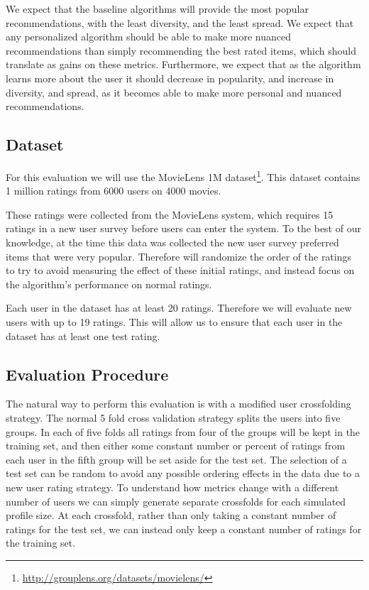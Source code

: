 \documentclass[letterpaper]{sig-alternate}
\begin{document}
  We expect that the baseline algorithms will provide the most popular recommendations, with the least diversity, and the least spread.
  We expect that any personalized algorithm should be able to make more nuanced recommendations than simply recommending the best rated items, which should translate as gains on these metrics.
  Furthermore, we expect that as the algorithm learns more about the user it should decrease in popularity, and increase in diversity, and spread, as it becomes able to make more personal and nuanced recommendations.


  \subsection*{Dataset}

  For this evaluation we will use the MovieLens 1M dataset\footnote{\url{http://grouplens.org/datasets/movielens/}}.
  This dataset contains 1 million ratings from 6000 users on 4000 movies.
  
  These ratings were collected from the MovieLens system, which requires 15 ratings in a new user survey before users can enter the system.
  To the best of our knowledge, at the time this data was collected the new user survey preferred items that were very popular.
  Therefore will randomize the order of the ratings to try to avoid measuring the effect of these initial ratings, and instead focus on the algorithm's performance on normal ratings.
  
  Each user in the dataset has at least 20 ratings.
  Therefore we will evaluate new users with up to 19 ratings.
  This will allow us to ensure that each user in the dataset has at least one test rating.

  
  \subsection*{Evaluation Procedure}

  The natural way to perform this evaluation is with a modified user crossfolding strategy.
  The normal 5 fold cross validation strategy splits the users into five groups.
  In each of five folds all ratings from four of the groups will be kept in the training set, and then either some constant number or percent of ratings from each user in the fifth group will be set aside for the test set.
  The selection of a test set can be random to avoid any possible ordering effects in the data due to a new user rating strategy.
  To understand how metrics change with a different number of users we can simply generate separate crossfolds for each simulated profile size.
  At each crossfold, rather than only taking a constant number of ratings for the test set, we can instead only keep a constant number of ratings for the training set.
  
\end{document}
